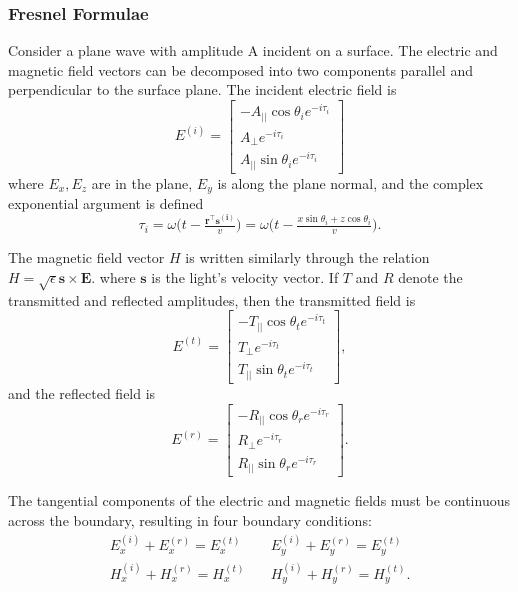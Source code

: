\subsubsection{Fresnel Formulae}
Consider a plane wave with amplitude A incident on a surface. The electric and magnetic field vectors can be decomposed into two components parallel and perpendicular to the surface plane. The incident electric field is
%
\begin{equation}
    E^{(i)} = 
    \begin{bmatrix}
        -A_{||} \cos{\theta_i} e^{-i \tau_i} \\
        A_\perp e^{-i \tau_i} \\
        A_{||} \sin{\theta_i} e^{-i \tau_i}
    \end{bmatrix}
\end{equation}
%
where $E_x, E_z$ are in the plane, $E_y$ is along the plane normal, and the complex exponential argument is defined
%
\begin{equation}
    \tau_i = \omega \big( t - \tfrac{\mathbf{r}^\intercal \mathbf{s^{(i)}}}{v} \big) = \omega \big( t - \tfrac{x \sin{\theta_i} + z \cos{\theta_i}}{v} \big).
\end{equation}

The magnetic field vector $H$ is written similarly through the relation $H = \sqrt{\epsilon} \mathbf{s} \times \mathbf{E}$.
where $\mathbf{s}$ is the light's velocity vector. If $T$ and $R$ denote the transmitted and reflected amplitudes, then the transmitted field is
%
\begin{equation}
    E^{(t)} = 
    \begin{bmatrix}
        -T_{||} \cos{\theta_t} e^{-i \tau_t} \\
        T_\perp e^{-i \tau_t} \\
        T_{||} \sin{\theta_t} e^{-i \tau_t}
    \end{bmatrix},
\end{equation}
%
and the reflected field is
%
\begin{equation}
    E^{(r)} = 
    \begin{bmatrix}
        -R_{||} \cos{\theta_r} e^{-i \tau_r} \\
        R_\perp e^{-i \tau_r} \\
        R_{||} \sin{\theta_r} e^{-i \tau_r}
    \end{bmatrix}.
\end{equation}

The tangential components of the electric and magnetic fields must be continuous across the boundary, resulting in four boundary conditions:
%
\begin{align}
    E^{(i)}_x + E^{(r)}_x = E^{(t)}_x \quad & E^{(i)}_y + E^{(r)}_y = E^{(t)}_y \\
    H^{(i)}_x + H^{(r)}_x = H^{(t)}_x \quad & H^{(i)}_y + H^{(r)}_y = H^{(t)}_y.
\end{align}

